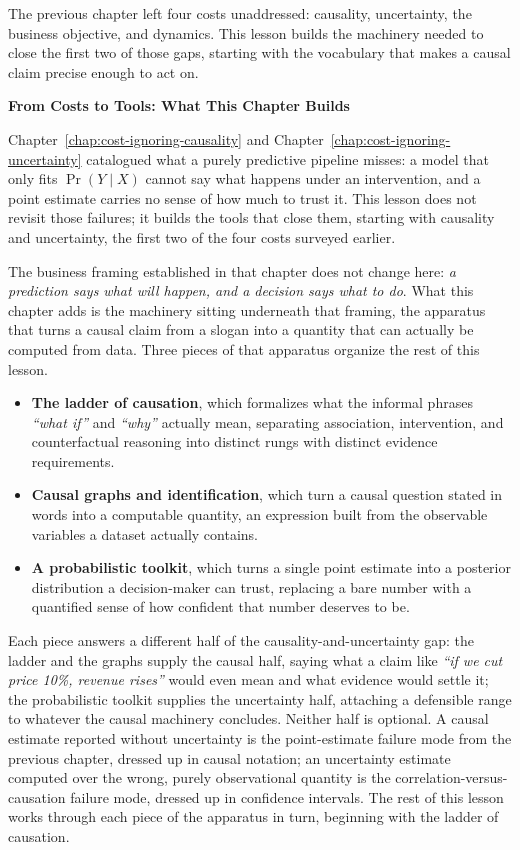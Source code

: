 The previous chapter left four costs unaddressed: causality, uncertainty, the business objective, and dynamics. This lesson builds the machinery needed to close the first two of those gaps, starting with the vocabulary that makes a causal claim precise enough to act on.

\textbf{From Costs to Tools: What This Chapter Builds}

Chapter~\ref{chap:cost-ignoring-causality} and Chapter~\ref{chap:cost-ignoring-uncertainty} catalogued what a purely predictive pipeline misses: a model that only fits $\Pr(Y \mid X)$ cannot say what happens under an intervention, and a point estimate carries no sense of how much to trust it. This lesson does not revisit those failures; it builds the tools that close them, starting with causality and uncertainty, the first two of the four costs surveyed earlier.

The business framing established in that chapter does not change here: \textit{a prediction says what will happen, and a decision says what to do}. What this chapter adds is the machinery sitting underneath that framing, the apparatus that turns a causal claim from a slogan into a quantity that can actually be computed from data. Three pieces of that apparatus organize the rest of this lesson.

\begin{itemize}
  \item \textbf{The ladder of causation}, which formalizes what the informal phrases \emph{``what if''} and \emph{``why''} actually mean, separating association, intervention, and counterfactual reasoning into distinct rungs with distinct evidence requirements.
  \item \textbf{Causal graphs and identification}, which turn a causal question stated in words into a computable quantity, an expression built from the observable variables a dataset actually contains.
  \item \textbf{A probabilistic toolkit}, which turns a single point estimate into a posterior distribution a decision-maker can trust, replacing a bare number with a quantified sense of how confident that number deserves to be.
\end{itemize}

Each piece answers a different half of the causality-and-uncertainty gap: the ladder and the graphs supply the causal half, saying what a claim like \emph{``if we cut price 10\%, revenue rises''} would even mean and what evidence would settle it; the probabilistic toolkit supplies the uncertainty half, attaching a defensible range to whatever the causal machinery concludes. Neither half is optional. A causal estimate reported without uncertainty is the point-estimate failure mode from the previous chapter, dressed up in causal notation; an uncertainty estimate computed over the wrong, purely observational quantity is the correlation-versus-causation failure mode, dressed up in confidence intervals. The rest of this lesson works through each piece of the apparatus in turn, beginning with the ladder of causation.

